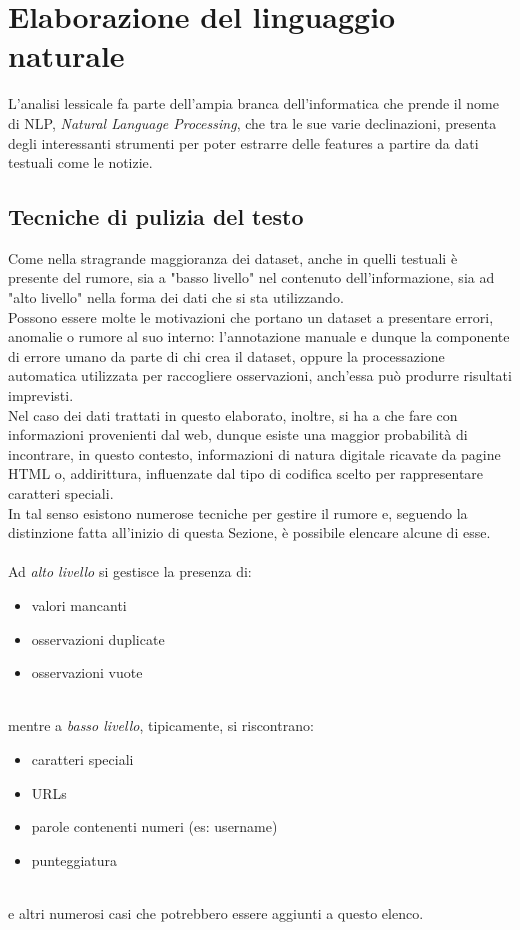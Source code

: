 \documentclass[12pt]{report}
\theoremstyle{definition}
\begin{document}
\section{Elaborazione del linguaggio naturale} \label{nlp}
L'analisi lessicale fa parte dell'ampia branca dell'informatica che prende il nome di NLP, \textit{Natural Language Processing}, che tra le sue varie declinazioni, presenta degli interessanti strumenti per poter estrarre delle features a partire da dati testuali come le notizie.


\subsection{Tecniche di pulizia del testo} \label{clean}
Come nella stragrande maggioranza dei dataset, anche in quelli testuali è presente del rumore, sia a "basso livello" nel contenuto dell'informazione, sia ad "alto livello" nella forma dei dati che si sta utilizzando.
\\
Possono essere molte le motivazioni che portano un dataset a presentare errori, anomalie o rumore al suo interno: 
l'annotazione manuale e dunque la componente di errore umano da parte di chi crea il dataset, oppure la processazione automatica utilizzata per raccogliere osservazioni, anch'essa può produrre risultati imprevisti.
\\
Nel caso dei dati trattati in questo elaborato, inoltre, si ha a che fare con informazioni provenienti dal web, dunque esiste una maggior probabilità di incontrare, in questo contesto, informazioni di natura digitale ricavate da pagine HTML o, addirittura, influenzate dal tipo di codifica scelto per rappresentare caratteri speciali.
\\
In tal senso esistono numerose tecniche per gestire il rumore e, seguendo la distinzione fatta all'inizio di questa Sezione, è possibile elencare alcune di esse.
\\
\\
Ad \textit{alto livello} si gestisce la presenza di:
\begin{itemize}
    \item valori mancanti
    \item osservazioni duplicate
    \item osservazioni vuote
\end{itemize}
\\
mentre a \textit{basso livello}, tipicamente, si riscontrano:
\begin{itemize}
    \item caratteri speciali
    \item URLs
    \item parole contenenti numeri (es: username)
    \item punteggiatura
\end{itemize}
\\
e altri numerosi casi che potrebbero essere aggiunti a questo elenco.
\end{document}
